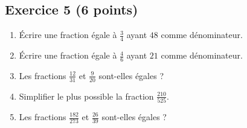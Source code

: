 \documentclass[14 pt]{extarticle}
\theoremstyle{plain}
\begin{document}
\subsection*{Exercice 5 (6 points)}
 

\begin{enumerate}
\item Écrire une fraction égale à $\frac34$ ayant $48$ comme dénominateur.
\item Écrire une fraction égale à $\frac46$ ayant $21$ comme dénominateur.
\item Les fractions $\frac{12}{31}$ et $\frac{9}{20}$ sont-elles égales ?
\item Simplifier le plus possible la fraction $\frac{210}{525}$.
\item Les fractions $\frac{182}{273}$ et $\frac{26}{39}$ sont-elles égales ?
\end{enumerate}

 	
\end{document}
